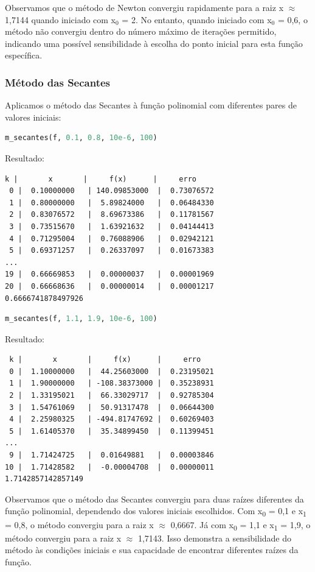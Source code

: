 \documentclass{article}
\begin{document}
Observamos que o método de Newton convergiu rapidamente para a raiz x $\approx$ 1,7144 quando iniciado com x$_0$ = 2. No entanto, quando iniciado com x$_0$ = 0,6, o método não convergiu dentro do número máximo de iterações permitido, indicando uma possível sensibilidade à escolha do ponto inicial para esta função específica.

\subsubsection{Método das Secantes}
Aplicamos o método das Secantes à função polinomial com diferentes pares de valores iniciais:

\begin{lstlisting}[language=Python]
m_secantes(f, 0.1, 0.8, 10e-6, 100)
\end{lstlisting}

Resultado:
\begin{verbatim}
k |       x       |     f(x)      |     erro      
 0 |  0.10000000   | 140.09853000  |  0.73076572   
 1 |  0.80000000   |  5.89824000   |  0.06484330   
 2 |  0.83076572   |  8.69673386   |  0.11781567   
 3 |  0.73515670   |  1.63921632   |  0.04144413   
 4 |  0.71295004   |  0.76088906   |  0.02942121   
 5 |  0.69371257   |  0.26337097   |  0.01673383   
...
19 |  0.66669853   |  0.00000037   |  0.00001969   
20 |  0.66668636   |  0.00000014   |  0.00001217   
0.6666741878497926
\end{verbatim}

\begin{lstlisting}[language=Python]
m_secantes(f, 1.1, 1.9, 10e-6, 100)
\end{lstlisting}

Resultado:
\begin{verbatim}
 k |       x       |     f(x)      |     erro      
 0 |  1.10000000   |  44.25603000  |  0.23195021   
 1 |  1.90000000   | -108.38373000 |  0.35238931   
 2 |  1.33195021   |  66.33029717  |  0.92785304   
 3 |  1.54761069   |  50.91317478  |  0.06644300   
 4 |  2.25980325   | -494.81747692 |  0.60269403   
 5 |  1.61405370   |  35.34899450  |  0.11399451   
...
 9 |  1.71424725   |  0.01649881   |  0.00003846   
10 |  1.71428582   |  -0.00004708  |  0.00000011   
1.7142857142857149
\end{verbatim}

Observamos que o método das Secantes convergiu para duas raízes diferentes da função polinomial, dependendo dos valores iniciais escolhidos. Com x\textsubscript{0} = 0,1 e x\textsubscript{1} = 0,8, o método convergiu para a raiz x $\approx$ 0,6667. Já com x\textsubscript{0} = 1,1 e x\textsubscript{1} = 1,9, o método convergiu para a raiz x $\approx$ 1,7143. Isso demonstra a sensibilidade do método às condições iniciais e sua capacidade de encontrar diferentes raízes da função.
\end{document}
